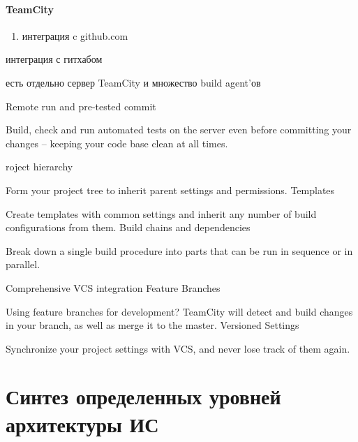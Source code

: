 \documentclass{article}
\begin{document}
\paragraph{TeamCity}
\begin{enumerate}
    \item{интеграция c github.com}
\end{enumerate}
интеграция с гитхабом

есть отдельно сервер TeamCity и множество build agent'ов 

Remote run and pre-tested commit

Build, check and run automated tests on the server even before committing your changes – keeping your code base clean at all times.

roject hierarchy

Form your project tree to inherit parent settings and permissions.
Templates

Create templates with common settings and inherit any number of build configurations from them.
Build chains and dependencies

Break down a single build procedure into parts that can be run in sequence or in parallel.



Comprehensive VCS integration
Feature Branches

Using feature branches for development? TeamCity will detect and build changes in your branch, as well as merge it to the master.
Versioned Settings

Synchronize your project settings with VCS, and never lose track of them again.


\pagebreak


\section{Синтез определенных уровней архитектуры ИС}
\end{document}
